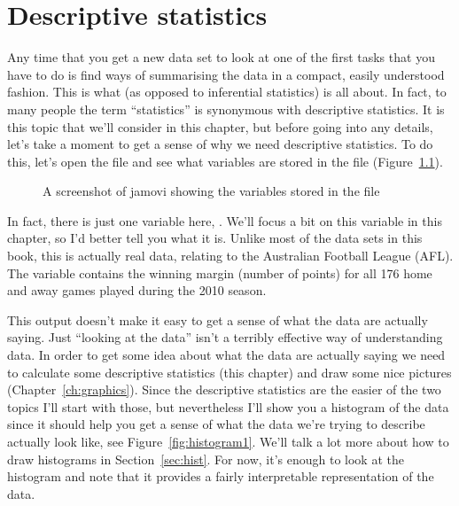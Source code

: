 
\chapter{Descriptive statistics\label{ch:descriptives}}

Any time that you get a new data set to look at one of the first tasks that you have to do is find ways of summarising the data in a compact, easily understood fashion. This is what  (as opposed to inferential statistics) is all about. In fact, to many people the term ``statistics'' is synonymous with descriptive statistics. It is this topic that we'll consider in this chapter, but before going into any details, let's take a moment to get a sense of why we need descriptive statistics. To do this, let's open the  file and see what variables are stored in the file (Figure~\ref{fig:aflsmall}).

\vspace{0.5cm}
\begin{figure}[htb]
\begin{center}
\caption{A screenshot of jamovi showing the variables stored in the  file} 
\label{fig:aflsmall}
\HR
\end{center}
\end{figure}

In fact, there is just one variable here, . We'll focus a bit on this variable in this chapter, so I'd better tell you what it is. Unlike most of the data sets in this book, this is actually real data, relating to the Australian Football League (AFL). The  variable contains the winning margin (number of points) for all 176 home and away games played during the 2010 season. 

This output doesn't make it easy to get a sense of what the data are actually saying. Just ``looking at the data'' isn't a terribly effective way of understanding data. In order to get some idea about what the data are actually saying we need to calculate some descriptive statistics (this chapter) and draw some nice pictures (Chapter~\ref{ch:graphics}). Since the descriptive statistics are the easier of the two topics I'll start with those, but nevertheless I'll show you a histogram of the  data since it should help you get a sense of what the data we're trying to describe actually look like, see Figure~\ref{fig:histogram1}. We'll talk a lot more about how to draw histograms in Section~\ref{sec:hist}. For now, it's enough to look at the histogram and note that it provides a fairly interpretable representation of the  data.

